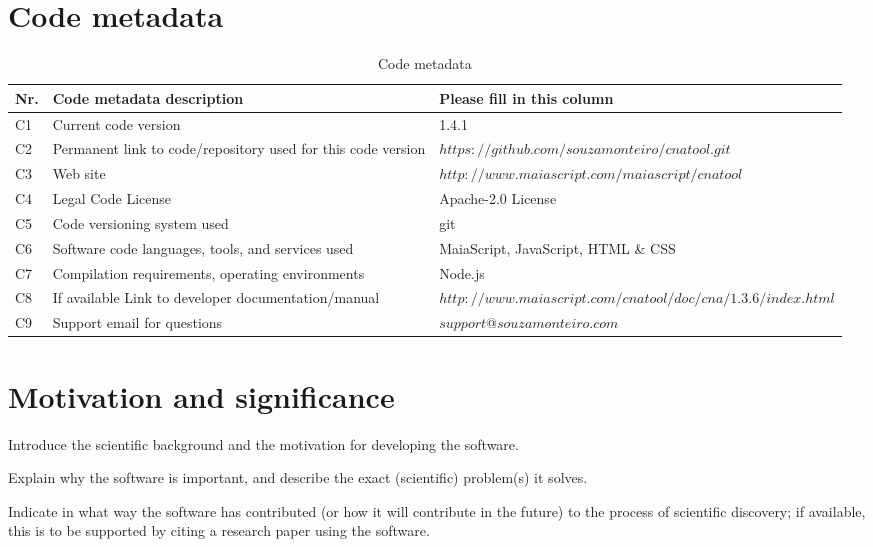 \documentclass[preprint,12pt, a4paper]{elsarticle}
\begin{document}
\section*{Code metadata}
\label{metadata}

\begin{table}[H]
\begin{tabular}{|l|p{6.5cm}|p{6.5cm}|}
\hline
\textbf{Nr.} & \textbf{Code metadata description} & \textbf{Please fill in this column} \\
\hline
C1 & Current code version & 1.4.1 \\
\hline
C2 & Permanent link to code/repository used for this code version & $https://github.com/souzamonteiro/cnatool.git$ \\
\hline
C3 & Web site & $http://www.maiascript.com/maiascript/cnatool$ \\
\hline
C4 & Legal Code License & Apache-2.0 License \\
\hline
C5 & Code versioning system used & git \\
\hline
C6 & Software code languages, tools, and services used & MaiaScript, JavaScript, HTML \& CSS \\
\hline
C7 & Compilation requirements, operating environments & Node.js \\
\hline
C8 & If available Link to developer documentation/manual & $http://www.maiascript.com/cnatool/doc/cna/1.3.6/index.html$ \\
\hline
C9 & Support email for questions & $support@souzamonteiro.com$ \\
\hline
\end{tabular}
\caption{Code metadata}
\label{} 
\end{table}

\linenumbers


\section{Motivation and significance}
\label{motivation}

\cite{Barabasi1999}
Introduce the scientific background and the motivation for developing the software.

Explain why the software is important, and describe the exact (scientific) problem(s) it solves.

Indicate in what way the software has contributed (or how it will contribute in the future) to the process of scientific discovery; if available, this is to be supported by citing a research paper using the software.
\end{document}

